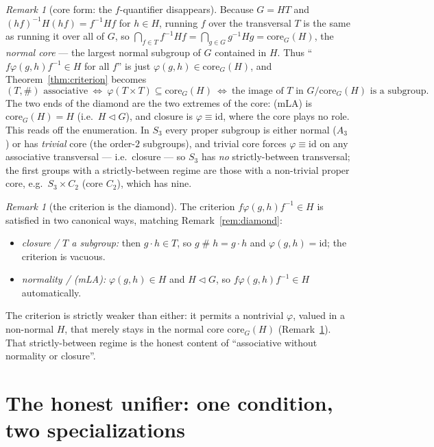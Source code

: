 \documentclass[11pt]{amsart}
\theoremstyle{plain}
\theoremstyle{definition}
\theoremstyle{remark}
\newtheorem{remark}[theorem]{Remark}
\renewcommand{\lhd}{\triangleleft}
\newcommand{\id}{\mathrm{id}}
\newcommand{\sh}{\mathbin{\#}}
\newcommand{\mLA}{\textsf{(mLA)}}
\begin{document}
\begin{remark}[core form: the $f$-quantifier disappears]
\label{rem:core}
Because $G=HT$ and $(hf)^{-1}H(hf)=f^{-1}Hf$ for $h\in H$, running $f$ over the transversal $T$ is the
same as running it over all of $G$, so $\bigcap_{f\in T}f^{-1}Hf=\bigcap_{g\in G}g^{-1}Hg
=\mathrm{core}_G(H)$, the \emph{normal core} --- the largest normal subgroup of $G$ contained in $H$.
Thus ``$f\varphi(g,h)f^{-1}\in H$ for all $f$'' is just $\varphi(g,h)\in\mathrm{core}_G(H)$, and
Theorem~\ref{thm:criterion} becomes
\[
  (T,\sh)\text{ associative}\ \Longleftrightarrow\ \varphi(T\times T)\subseteq\mathrm{core}_G(H)
  \ \Longleftrightarrow\ \text{the image of }T\text{ in }G/\mathrm{core}_G(H)\text{ is a subgroup.}
\]
The two ends of the diamond are the two extremes of the core: \mLA{} is $\mathrm{core}_G(H)=H$ (i.e.\
$H\lhd G$), and closure is $\varphi\equiv\id$, where the core plays no role. This reads off the
enumeration. In $S_3$ every proper subgroup is either normal ($A_3$) or has \emph{trivial} core (the
order-$2$ subgroups), and trivial core forces $\varphi\equiv\id$ on any associative transversal
--- i.e.\ closure --- so $S_3$ has \emph{no} strictly-between transversal; the first groups with a
strictly-between regime are those with a non-trivial proper core, e.g.\ $S_3\times C_2$ (core $C_2$),
which has nine.
\end{remark}

\begin{remark}[the criterion is the diamond]
\label{rem:unify}
The criterion $f\varphi(g,h)f^{-1}\in H$ is satisfied in two canonical ways, matching
Remark~\ref{rem:diamond}:
\begin{itemize}
  \item \emph{closure / $T$ a subgroup:} then $g\cdot h\in T$, so $g\sh h=g\cdot h$ and
        $\varphi(g,h)=\id$; the criterion is vacuous.
  \item \emph{normality / \mLA{}:} $\varphi(g,h)\in H$ and $H\lhd G$, so $f\varphi(g,h)f^{-1}\in H$
        automatically.
\end{itemize}
The criterion is strictly weaker than either: it permits a nontrivial $\varphi$, valued in a
non-normal $H$, that merely stays in the normal core $\mathrm{core}_G(H)$ (Remark~\ref{rem:core}).
That strictly-between regime is the honest content of ``associative without normality or closure''.
\end{remark}

\section{The honest unifier: one condition, two specializations}
\label{sec:unifier}
\end{document}
